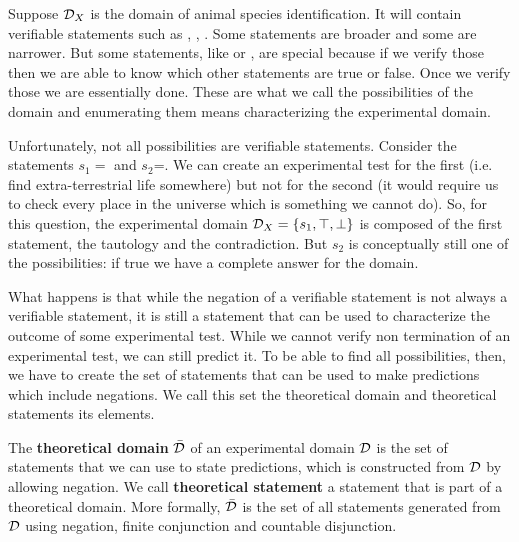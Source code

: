 \documentclass[11pt,letterpaper,fleqn]{memoir} %
\begin{document}
Suppose $\mathcal{D}_X$ is the domain of animal species identification. It will contain verifiable statements such as , , . Some statements are broader and some are narrower. But some statements, like  or , are special because if we verify those then we are able to know which other statements are true or false. Once we verify those we are essentially done. These are what we call the possibilities of the domain and enumerating them means characterizing the experimental domain.

Unfortunately, not all possibilities are verifiable statements. Consider the statements $s_1=$ and $s_2$=. We can create an experimental test for the first (i.e. find extra-terrestrial life somewhere) but not for the second (it would require us to check every place in the universe which is something we cannot do). So, for this question, the experimental domain $\mathcal{D}_X = \{s_1, \top, \bot\}$ is composed of the first statement, the tautology and the contradiction. But $s_2$ is conceptually still one of the possibilities: if true we have a complete answer for the domain.

What happens is that while the negation of a verifiable statement is not always a verifiable statement, it is still a statement that can be used to characterize the outcome of some experimental test. While we cannot verify non termination of an experimental test, we can still predict it. To be able to find all possibilities, then, we have to create the set of statements that can be used to make predictions which include negations. We call this set the theoretical domain and theoretical statements its elements.

\begin{mathSection}
\begin{defn}
	The \textbf{theoretical domain} $\bar{\mathcal{D}}$ of an experimental domain $\mathcal{D}$ is the set of statements that we can use to state predictions, which is constructed from $\mathcal{D}$ by allowing negation. We call \textbf{theoretical statement} a statement that is part of a theoretical domain. More formally, $\bar{\mathcal{D}}$ is the set of all statements generated from $\mathcal{D}$ using negation, finite conjunction and countable disjunction.
\end{defn}
\end{mathSection}
\end{document}
